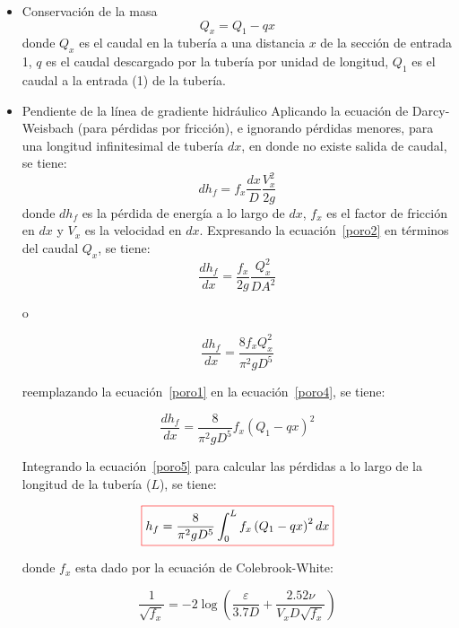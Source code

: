 \documentclass[10pt, oneside]{article}
\begin{document}
\begin{itemize}
\item Conservaci\'on de la masa
\begin{equation}
Q_x = Q_1 - q x
\label{poro1}
\end{equation}
donde $Q_x$ es el caudal en la tuber\'ia a una distancia $x$ de la secci\'on de entrada 1, $q$ es el caudal descargado por la tuber\'ia por unidad de longitud, $Q_1$ es el caudal a la entrada (1) de la tuber\'ia.

\item Pendiente de la l\'inea de gradiente hidr\'aulico
Aplicando la ecuaci\'on de Darcy-Weisbach (para p\'erdidas por fricci\'on), e ignorando p\'erdidas menores,  para una longitud infinitesimal de tuber\'ia $dx$,  en donde no existe salida de caudal, se tiene:
\begin{equation}
d h_f = f_x \frac{dx}{D}\frac{V_x^2}{2g}
\label{poro2}
\end{equation}
donde $d h_f$ es la p\'erdida de energ\'ia a lo largo de $dx$, $f_x$ es el factor de fricci\'on en $dx$ y $V_x$ es la velocidad en $dx$. Expresando la ecuaci\'on~\ref{poro2} en t\'erminos del caudal $Q_x$, se tiene:
\begin{equation}
\frac{d h_f}{dx} = \frac{f_x}{2g}\frac{Q_x^2}{D A^2}
\label{poro3}
\end{equation}

o

\begin{equation}
\frac{d h_f}{dx} = \frac{8 f_x Q_x^2}{\pi^2 g D^5}
\label{poro4}
\end{equation}

reemplazando la ecuaci\'on~\ref{poro1} en la ecuaci\'on~\ref{poro4}, se tiene:

\begin{equation}
\frac{d h_f}{dx} = \frac{8}{\pi^2 g D^5} f_x \left( Q_1 - q x\right)^2
\label{poro5}
\end{equation}

Integrando la ecuaci\'on~\ref{poro5} para calcular las p\'erdidas a lo largo de la longitud de la tuber\'ia ($L$), se tiene:

\begin{equation}
 \color{red}\boxed{\color{black} h_f = \frac{8}{\pi^2 g D^5} \int_0^L f_x \left( Q_1 - q x\right)^2 dx }
\label{poro6}
\end{equation}

donde $f_x$ esta dado por la ecuaci\'on de Colebrook-White:

\begin{equation}
\frac{1}{\sqrt{f_x}}= -2 \log \left( \frac{\varepsilon}{3.7D} + \frac{2.52 \nu}{V_x D \sqrt{f_x}} \right) 
\label{poro7}
\end{equation}


\end{itemize}
\end{document}
